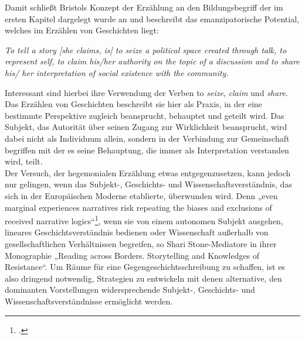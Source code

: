   Damit schließt Bristols Konzept der Erzählung an den Bildungsbegriff der im
  ersten Kapitel dargelegt wurde an und beschreibt das emanzipatorische
  Potential, welches im Erzählen von Geschichten liegt:
  \begin{myenv}

\textit{\glqq To tell a story [she claims, is] to seize a political space
  created through talk, to represent self, to claim his/her authority on
  the topic of a discussion and to share his/ her interpretation of social
existence with the community.\grqq\footnotemark {}} 
\end{myenv}

Interessant sind hierbei ihre Verwendung der Verben to \textit{seize},
\textit{claim} und \textit{share}.
Das Erzählen von Geschichten beschreibt sie hier als Praxis, in der eine
bestimmte Perspektive zugleich beansprucht, behauptet und geteilt wird. Das
Subjekt, das Autorität über seinen Zugang zur Wirklichkeit beansprucht, wird
dabei nicht als Individuum allein, sondern in der Verbindung zur Gemeinschaft
begriffen mit der es seine Behauptung, die immer als Interpretation verstanden wird, teilt.\\

Der Versuch, der hegemonialen Erzählung etwas entgegenzusetzen, kann jedoch nur
gelingen, wenn das Subjekt-, Geschichts- und Wissenschaftsverständnis, das sich
in der Europäischen Moderne etablierte, überwunden wird. Denn „even marginal
experiences narratives risk repeating the biases and exclusions of received
narrative logics“\footnotemark \footcitetext[S. 142]{sstone}, wenn sie von einem autonomen Subjekt ausgehen, lineares
Geschichtsverständnis bedienen oder Wissenschaft außerhalb von
gesellschaftlichen Verhältnissen begreifen, so Shari Stone-Mediatore in ihrer
Monographie „Reading across Borders. Storytelling and Knowledges of
Resistance“\footnotemark {}. Um Räume für eine Gegengeschichtsschreibung zu schaffen, ist es
also dringend notwendig, Strategien zu entwickeln mit denen alternative, den
dominanten Vorstellungen widersprechende Subjekt-, Geschichts- und
Wissenschaftsverständnisse ermöglicht werden.
\\

